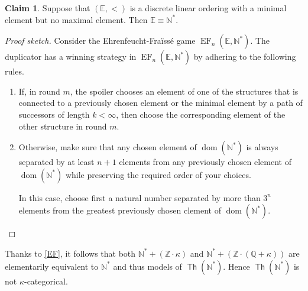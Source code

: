 \documentclass[10pt,letterpaper,cm]{nupset}
\theoremstyle{definition}
\theoremstyle{theorem}
\newtheorem{claim}{Claim}
\theoremstyle{remark}
\newcommand{\E}{\mathbb E}
\newcommand{\N}{\mathbb N}
\newcommand{\Q}{\mathbb Q}
\newcommand{\Z}{\mathbb Z}
\newcommand{\1}{\mathbb{1}}
\renewcommand{\i}{\vec i}
\newcommand{\0}{\vec 0}
\DeclareMathOperator{\dom}{dom}
\DeclareMathOperator{\ef}{EF}
\DeclareMathOperator{\thh}{\mathsf{Th}}
\begin{document}
\begin{solution}
\begin{claim}
Suppose that $\left(\E, <\right)$ is a discrete linear ordering with a minimal element but no maximal element. Then $\E \equiv \N^{\ast}$.
\end{claim}
\begin{proof}[Proof sketch]
Consider the Ehrenfeucht-Fra\"{\i}ss\'e  game $\ef_n(\E, \N^{\ast})$. The duplicator has a winning strategy in $\ef_n(\E, \N^{\ast})$ by adhering to the following rules.
\begin{enumerate}[label=(\roman*)]
\item If, in round $m$, the spoiler chooses an element of one of the structures that is connected to a previously chosen element or the minimal element by a path of successors of length $k<\infty$, then choose the corresponding element of the other structure in round $m$.
\item Otherwise, make sure that any chosen element of $\dom(\N^{\ast})$ is always separated by at least $n+1$ elements from any previously chosen element of $\dom(\N^{\ast})$ while preserving the required order of your choices. 

In this case, choose first a natural number separated by more than $3^n$ elements from the greatest previously chosen clement of $\dom(\N^{\ast})$.
\end{enumerate}
\end{proof}
Thanks to \cref{EF}, it follows that both $ {\N^{\ast} + \left(\Z \cdot \kappa\right)}$ and ${\N^{\ast} +  \left(\Z \cdot \left(\Q +\kappa\right)\right)}$ are elementarily equivalent to $\N^{\ast}$ and thus models of $\thh(\N^{\ast})$. Hence $\thh(\N^{\ast})$ is not $\kappa$-categorical. 
\end{solution}
\end{document}
